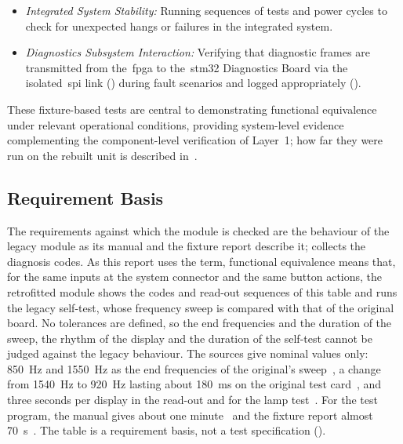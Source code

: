 \begin{description}
\begin{itemize}
		      \item \textit{Integrated System Stability:} Running sequences of tests and power cycles to check for unexpected hangs or failures in the integrated system.
		      \item \textit{Diagnostics Subsystem Interaction:} Verifying that diagnostic frames are transmitted from the~\gls{fpga} to the~\gls{stm32} Diagnostics Board via the isolated~\gls{spi} link () during fault scenarios and logged appropriately ().
	      \end{itemize}
\end{description}
These fixture-based tests are central to demonstrating functional equivalence under relevant operational conditions, providing system-level evidence complementing the component-level verification of Layer~1; how far they were run on the rebuilt unit is described in~.

\subsection{Requirement Basis}
\label{subsec:requirement_basis}

The requirements against which the module is checked are the behaviour of the legacy module as its manual and the fixture report describe it;  collects the diagnosis codes. As this report uses the term, functional equivalence means that, for the same inputs at the system connector and the same button actions, the retrofitted module shows the codes and read-out sequences of this table and runs the legacy self-test, whose frequency sweep is compared with that of the original board. No tolerances are defined, so the end frequencies and the duration of the sweep, the rhythm of the display and the duration of the self-test cannot be judged against the legacy behaviour. The sources give nominal values only: \SI{850}{\hertz} and \SI{1550}{\hertz} as the end frequencies of the original's sweep~\cite[Sec.~2.9]{leyer2023}, a change from \SI{1540}{\hertz} to \SI{920}{\hertz} lasting about \SI{180}{\milli\second} on the original test card~\cite[Sec.~5.1.5, 5.2]{dolata2023}, and three seconds per display in the read-out and for the lamp test~\cite[Blatt~14/25]{rexroth1992wsp}. For the test program, the manual gives about one minute~\cite[Blatt~14/25, 18/25]{rexroth1992wsp} and the fixture report almost \SI{70}{\second}~\cite[Sec.~5.1]{dolata2023}. The table is a requirement basis, not a test specification ().

